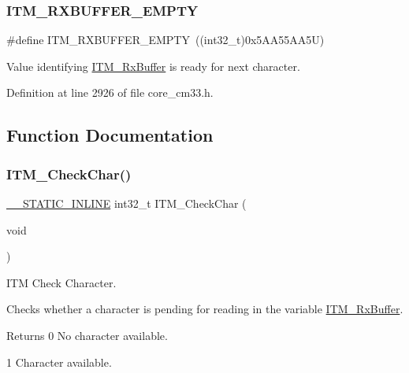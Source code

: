 \subsubsection{\texorpdfstring{I\+T\+M\+\_\+\+R\+X\+B\+U\+F\+F\+E\+R\+\_\+\+E\+M\+P\+TY}{ITM\_RXBUFFER\_EMPTY}\hspace{0.1cm}{\footnotesize\ttfamily [7/7]}}
{\footnotesize\ttfamily \#define I\+T\+M\+\_\+\+R\+X\+B\+U\+F\+F\+E\+R\+\_\+\+E\+M\+P\+TY~((int32\+\_\+t)0x5\+A\+A55\+A\+A5\+U)}

Value identifying \hyperlink{group___c_m_s_i_s__core___debug_functions_ga12e68e55a7badc271b948d6c7230b2a8}{I\+T\+M\+\_\+\+Rx\+Buffer} is ready for next character. 

Definition at line 2926 of file core\+\_\+cm33.\+h.



\subsection{Function Documentation}
\mbox{\label{group___c_m_s_i_s__core___debug_functions_gae61ce9ca5917735325cd93b0fb21dd29}} 
\subsubsection{\texorpdfstring{I\+T\+M\+\_\+\+Check\+Char()}{ITM\_CheckChar()}}
{\footnotesize\ttfamily \hyperlink{cmsis__iccarm_8h_aba87361bfad2ae52cfe2f40c1a1dbf9c}{\+\_\+\+\_\+\+S\+T\+A\+T\+I\+C\+\_\+\+I\+N\+L\+I\+NE} int32\+\_\+t I\+T\+M\+\_\+\+Check\+Char (\begin{DoxyParamCaption}\item[{void}]{ }\end{DoxyParamCaption})}



I\+TM Check Character. 

Checks whether a character is pending for reading in the variable \hyperlink{group___c_m_s_i_s__core___debug_functions_ga12e68e55a7badc271b948d6c7230b2a8}{I\+T\+M\+\_\+\+Rx\+Buffer}. \begin{DoxyReturn}{Returns}
0 No character available. 

1 Character available. 
\end{DoxyReturn}


